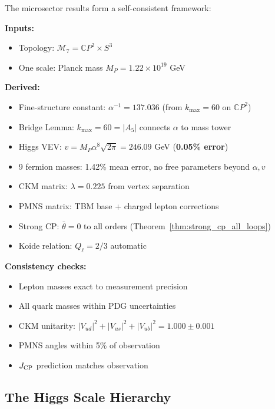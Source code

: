 The microsector results form a self-consistent framework:

\begin{tcolorbox}[colback=blue!5!white, colframe=blue!50!black, title=Microsector Summary]
\textbf{Inputs:}
\begin{itemize}[nosep]
\item Topology: $\mathcal{M}_7 = \mathbb{C}P^2 \times S^3$
\item One scale: Planck mass $M_P = 1.22 \times 10^{19}$ GeV
\end{itemize}

\textbf{Derived:}
\begin{itemize}[nosep]
\item Fine-structure constant: $\alpha^{-1} = 137.036$ (from $k_{\max} = 60$ on $\mathbb{C}P^2$)
\item Bridge Lemma: $k_{\max} = 60 = |A_5|$ connects $\alpha$ to mass tower
\item Higgs VEV: $v = M_P \alpha^8 \sqrt{2\pi} = 246.09$ GeV (\textbf{0.05\% error})
\item 9 fermion masses: 1.42\% mean error, no free parameters beyond $\alpha, v$
\item CKM matrix: $\lambda = 0.225$ from vertex separation
\item PMNS matrix: TBM base + charged lepton corrections
\item Strong CP: $\bar{\theta} = 0$ to all orders (Theorem~\ref{thm:strong_cp_all_loops})
\item Koide relation: $Q_\ell = 2/3$ automatic
\end{itemize}

\textbf{Consistency checks:}
\begin{itemize}[nosep]
\item Lepton masses exact to measurement precision
\item All quark masses within PDG uncertainties
\item CKM unitarity: $|V_{ud}|^2 + |V_{us}|^2 + |V_{ub}|^2 = 1.000 \pm 0.001$
\item PMNS angles within 5\% of observation
\item $J_{\rm CP}$ prediction matches observation
\end{itemize}
\end{tcolorbox}

\subsection{The Higgs Scale Hierarchy}\label{app:higgs-hierarchy}

